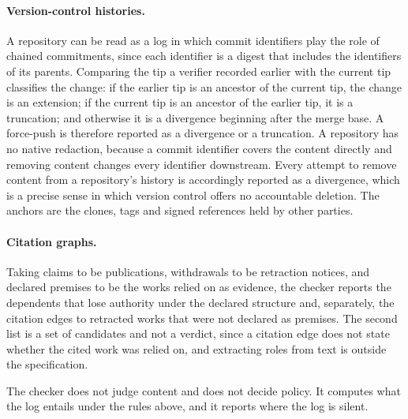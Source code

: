 \documentclass[11pt]{article}
\theoremstyle{plain}
\theoremstyle{definition}
\theoremstyle{remark}
\begin{document}
\paragraph{Version-control histories.} A repository can be read as a log in which commit identifiers play the role of chained commitments, since each identifier is a digest that includes the identifiers of its parents. Comparing the tip a verifier recorded earlier with the current tip classifies the change: if the earlier tip is an ancestor of the current tip, the change is an extension; if the current tip is an ancestor of the earlier tip, it is a truncation; and otherwise it is a divergence beginning after the merge base. A force-push is therefore reported as a divergence or a truncation. A repository has no native redaction, because a commit identifier covers the content directly and removing content changes every identifier downstream. Every attempt to remove content from a repository's history is accordingly reported as a divergence, which is a precise sense in which version control offers no accountable deletion. The anchors are the clones, tags and signed references held by other parties.

\paragraph{Citation graphs.} Taking claims to be publications, withdrawals to be retraction notices, and declared premises to be the works relied on as evidence, the checker reports the dependents that lose authority under the declared structure and, separately, the citation edges to retracted works that were not declared as premises. The second list is a set of candidates and not a verdict, since a citation edge does not state whether the cited work was relied on, and extracting roles from text is outside the specification.

The checker does not judge content and does not decide policy. It computes what the log entails under the rules above, and it reports where the log is silent.
\end{document}
